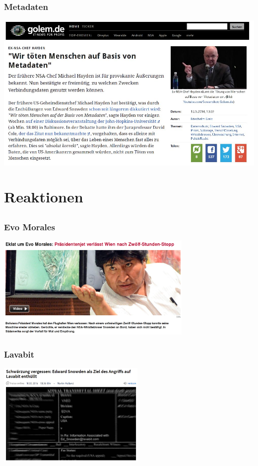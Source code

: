 \documentclass[12pt, xcolor={svgnames,table}]{beamer}
\begin{document}
\begin{frame}
    \frametitle{Metadaten}
    \begin{center}
      \includegraphics[height=0.7\textheight]{img/wekillpeople.jpg}
    \end{center}
\end{frame}

\section{Reaktionen}
\subsection{}


\begin{frame}
  \frametitle{Evo Morales}
    \begin{center}
      \includegraphics[height=5cm]{img/evomorales.png}
    \end{center}
\end{frame}

\begin{frame}
  \frametitle{Lavabit}
    \begin{center}
      \includegraphics[height=5cm]{img/lavabit.png}
    \end{center}
\end{frame}
\end{document}
